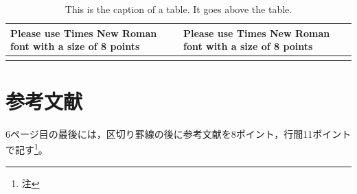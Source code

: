 \documentclass[base=10pt,magstyle=real,a4paper,twocolumn,xelatex,pandoc,jafont=noto]{bxjsarticle}%
\begin{document}
\begin{table}[H]
	\caption{This is the caption of a table. It goes above the table.}
	\label{tab:joho}
	\small
	\centering
	\begin{tabular}{l|l}
		\hline 
		Please use Times New Roman font with a size of 8 points
		& Please use Times New Roman font with a size of 8 points
		\\ 
		\hline \hline
		 & \\
		\hline 
	\end{tabular} 
\end{table}


\section{参考文献}
6ページ目の最後には，区切り罫線の後に参考文献を8ポイント，行間11ポイントで記す\footnote{注}。
\end{document}
